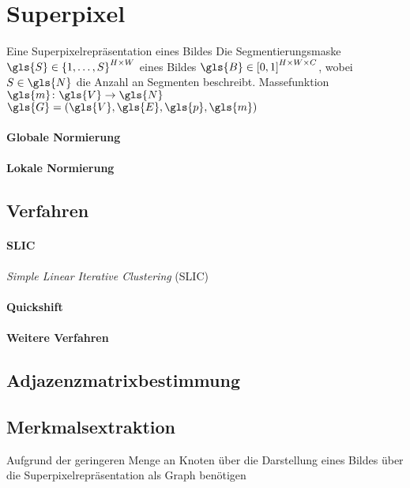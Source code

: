 \section{Superpixel}
\label{superpixel}

Eine Superpixelrepräsentation eines Bildes
Die Segmentierungsmaske $\gls{S} \in {\left\{1, \ldots, S\right\}}^{H \times W}$ eines Bildes $\gls{B} \in {\left[0, 1\right]}^{H \times W \times C}$, wobei $S \in \gls{N}$ die Anzahl an Segmenten beschreibt.
Massefunktion $\gls{m} \colon \gls{V} \to \gls{N}$
$\gls{G} = \left(\gls{V}, \gls{E}, \gls{p}, \gls{m}\right)$

\paragraph{Globale Normierung}
\label{globale_normierung}

\paragraph{Lokale Normierung}
\label{globale_normierung}

\subsection{Verfahren}
\label{superpixel_verfahren}

\paragraph{SLIC}
\label{slic}

\cite{slic}

\emph{Simple Linear Iterative Clustering} (SLIC)

\paragraph{Quickshift}
\label{quickshift}

\cite{quickshift}

\paragraph{Weitere Verfahren}
\label{weitere_superpixel_verfahren}

\cite{felzenszwalb}

\subsection{Adjazenzmatrixbestimmung}
\label{adjazenzmatrixbestimmung}

\subsection{Merkmalsextraktion}
\label{merkmalsextraktion}

Aufgrund der geringeren Menge an Knoten über die Darstellung eines Bildes über die Superpixelrepräsentation als Graph benötigen
\cite{Siedhoff}
\cite{momente}
